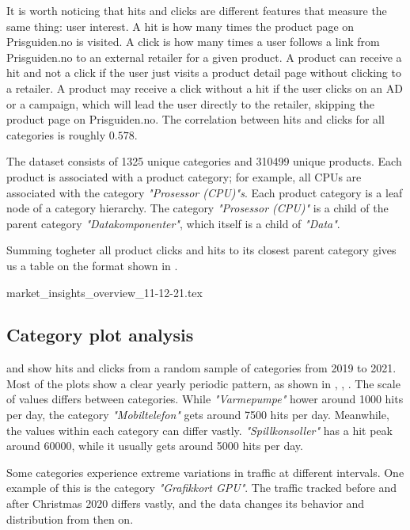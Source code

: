 It is worth noticing that hits and clicks are different features that measure the same thing: user interest.
A hit is how many times the product page on Prisguiden.no is visited.
A click is how many times a user follows a link from Prisguiden.no to an external retailer for a given product.
A product can receive a hit and not a click if the user just visits a product detail page without clicking to a retailer.
A product may receive a click without a hit if the user clicks on an AD or a campaign, which will lead the user directly to the retailer,
skipping the product page on Prisguiden.no.
The correlation between hits and clicks for all categories is roughly $0.578$.

The dataset consists of 1325 unique categories and 310499 unique products.
Each product is associated with a product category; for example,
all CPUs are associated with the category
\textit{"Prosessor (CPU)"s}.
Each product category is a leaf node of a category hierarchy.
The category \textit{"Prosessor (CPU)"} is a child of the parent category
\textit{"Datakomponenter"}, which itself is a child of \textit{"Data"}.

Summing togheter all product clicks and hits to its closest parent category
gives us a table on the format shown in .

{market_insights_overview_11-12-21.tex}

\subsection{Category plot analysis}
 and  show hits and clicks
from a random sample of categories from 2019 to 2021.
Most of the plots show a clear yearly periodic pattern, as shown in
,
,
.
The scale of values differs between categories.
While \textit{"Varmepumpe"}  hower around 1000 hits per day,
the category \textit{"Mobiltelefon"}  gets around 7500 hits per day.
Meanwhile, the values within each category can differ vastly.
\textit{"Spillkonsoller"}  has a hit peak around 60000,
while it usually gets around 5000 hits per day.

Some categories experience extreme variations in traffic at different intervals.
One example of this is the category \textit{"Grafikkort GPU"}.
The traffic tracked before and after Christmas 2020 differs vastly,
and the data changes its behavior and distribution from then on.

